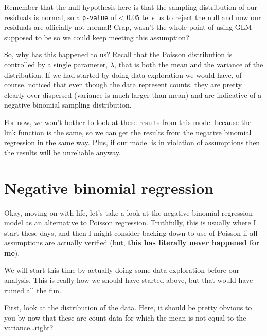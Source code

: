 \documentclass[
]{book}
\newenvironment{Shaded}{\begin{snugshade}}{\end{snugshade}}
\newcommand{\KeywordTok}[1]{\textcolor[rgb]{0.13,0.29,0.53}{\textbf{#1}}}
\newcommand{\NormalTok}[1]{#1}
\newcommand{\OperatorTok}[1]{\textcolor[rgb]{0.81,0.36,0.00}{\textbf{#1}}}
\begin{document}
Remember that the null hypothesis here is that the sampling distribution of our residuals is normal, so a \texttt{p-value} of \textless{} 0.05 tells us to reject the null and now our residuals are officially not normal! Crap, wasn't the whole point of using GLM supposed to be so we could keep meeting this assumption?

So, why has this happened to us? Recall that the Poisson distribution is controlled by a single parameter, \(\lambda\), that is both the mean and the variance of the distribution. If we had started by doing data exploration we would have, of course, noticed that even though the data represent counts, they are pretty clearly over-dispersed (variance is much larger than mean) and are indicative of a negative binomial sampling distribution.

For now, we won't bother to look at these results from this model because the link function is the same, so we can get the results from the negative binomial regression in the same way. Plus, if our model is in violation of assumptions then the results will be unreliable anyway.

\hypertarget{negbin}{%
\section{Negative binomial regression}\label{negbin}}

Okay, moving on with life, let's take a look at the negative binomial regression model as an alternative to Poisson regression. Truthfully, this is usually where I start these days, and then I might consider backing down to use of Poisson if all assumptions are actually verified (but, \textbf{this has literally never happened for me}).

We will start this time by actually doing some data exploration before our analysis. This is really how we should have started above, but that would have ruined all the fun.

First, look at the distribution of the data. Here, it should be pretty obvious to you by now that these are count data for which the mean is not equal to the variance\ldots right?

\begin{Shaded}
\end{Shaded}
\end{document}
